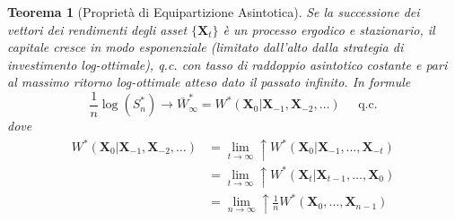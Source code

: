 \documentclass[a4paper,11pt]{book}
\theoremstyle{plain}
\newtheorem{teo}{Teorema}[chapter]
\theoremstyle{definition}
\theoremstyle{remark}
\newcommand{\X}{\bm{X}}
\begin{document}
\begin{teo}[Proprietà di Equipartizione Asintotica]
	Se la successione dei vettori dei rendimenti degli asset $\{\X_t\}$ è un processo ergodico e stazionario, il capitale cresce in modo esponenziale (limitato dall'alto dalla strategia di investimento log-ottimale), q.c. con tasso di raddoppio asintotico costante e pari al massimo ritorno log-ottimale atteso dato il passato infinito. In formule 
	\begin{equation*}
		\frac{1}{n}\log(S_n^*)\rightarrow \bar{W}_\infty^*=W^*(\X_0|\X_{-1},\X_{-2},\ldots) \;\;\;\;\; \text{q.c.}
	\end{equation*}
	dove
	\begin{equation*}
		\begin{split}
		W^*(\X_0|\X_{-1},\X_{-2},\ldots) & = \lim\limits_{t\to\infty}\uparrow W^*(\X_0|\X_{-1},\ldots,\X_{-t})\\
		& = \lim\limits_{t\to\infty}\uparrow W^*(\X_t|\X_{t-1},\ldots,\X_{0})\\
		& = \lim\limits_{n\to\infty}\uparrow \frac{1}{n}W^*(\X_0,\ldots,\X_{n-1})
		\end{split}
	\end{equation*}
\end{teo}
\end{document}
